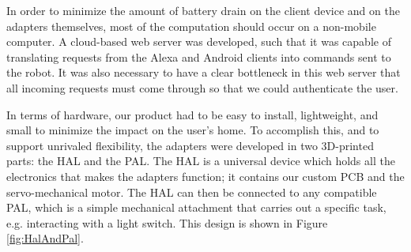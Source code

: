 \documentclass[onecolumn]{IEEEtran}
\begin{document}
    {In order to minimize the amount of battery drain on the client device and on 
    the adapters themselves, most of the computation should occur on a non-mobile 
    computer. A cloud-based web server was developed, such that it was capable of 
    translating requests from the Alexa and Android clients into commands sent to 
    the robot. It was also necessary to have a clear bottleneck in this web server 
    that all incoming requests must come through so that we could authenticate the 
    user.}
    
    {In terms of hardware, our product had to be easy to install, lightweight, and 
    small to minimize the impact on the user's home. To accomplish this, and to support unrivaled flexibility, the 
    adapters were developed in two 3D-printed parts: the HAL and the PAL. The HAL 
    is a universal device which holds all the electronics that makes the adapters 
    function; it contains our custom PCB and the servo-mechanical motor. 
    The HAL can then be connected to any compatible PAL, which is a simple 
    mechanical attachment that carries out a specific task, e.g. interacting
    with a light switch. This design is shown in Figure \ref{fig:HalAndPal}.}
\end{document}
